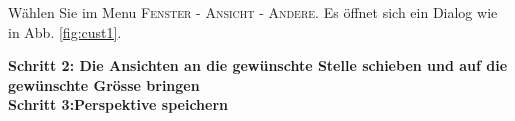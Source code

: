 Wählen Sie im Menu \textsc{Fenster - Ansicht - Andere}. Es öffnet sich ein Dialog wie in Abb. \ref{fig:cust1}.
 \bigskip

\textbf{Schritt 2: Die Ansichten an die gewünschte Stelle schieben und auf die gewünschte Grösse bringen}\\

\bigskip
\textbf{Schritt 3:Perspektive speichern}\\


